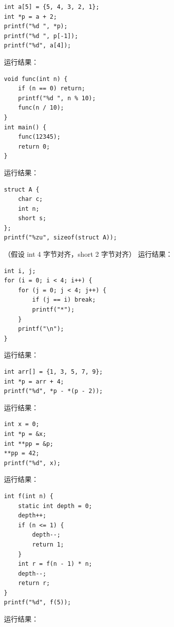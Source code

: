 \documentclass[a4paper,11pt]{article}
\begin{document}
\q
\begin{lstlisting}[language={[custom]C}]
int a[5] = {5, 4, 3, 2, 1};
int *p = a + 2;
printf("%d ", *p);
printf("%d ", p[-1]);
printf("%d", a[4]);
\end{lstlisting}
运行结果：\underline{\hspace{3cm}}


\q
\begin{lstlisting}[language={[custom]C}]
void func(int n) {
    if (n == 0) return;
    printf("%d ", n % 10);
    func(n / 10);
}
int main() {
    func(12345);
    return 0;
}
\end{lstlisting}
运行结果：\underline{\hspace{3cm}}


\q
\begin{lstlisting}[language={[custom]C}]
struct A {
    char c;
    int n;
    short s;
};
printf("%zu", sizeof(struct A));
\end{lstlisting}
（假设 int 4 字节对齐，short 2 字节对齐）
运行结果：\underline{\hspace{3cm}}


\q
\begin{lstlisting}[language={[custom]C}]
int i, j;
for (i = 0; i < 4; i++) {
    for (j = 0; j < 4; j++) {
        if (j == i) break;
        printf("*");
    }
    printf("\n");
}
\end{lstlisting}
运行结果：\underline{\hspace{3cm}}


\q
\begin{lstlisting}[language={[custom]C}]
int arr[] = {1, 3, 5, 7, 9};
int *p = arr + 4;
printf("%d", *p - *(p - 2));
\end{lstlisting}
运行结果：\underline{\hspace{3cm}}


\q
\begin{lstlisting}[language={[custom]C}]
int x = 0;
int *p = &x;
int **pp = &p;
**pp = 42;
printf("%d", x);
\end{lstlisting}
运行结果：\underline{\hspace{3cm}}


\q
\begin{lstlisting}[language={[custom]C}]
int f(int n) {
    static int depth = 0;
    depth++;
    if (n <= 1) {
        depth--;
        return 1;
    }
    int r = f(n - 1) * n;
    depth--;
    return r;
}
printf("%d", f(5));
\end{lstlisting}
运行结果：\underline{\hspace{3cm}}
\end{document}
